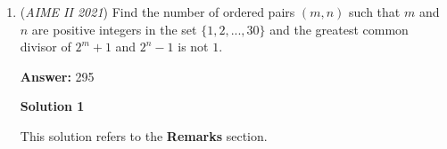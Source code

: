 \begin{enumerate}
            \begin{itemize}
        \item \href{https://artofproblemsolving.com/wiki/index.php/2003\_AIME\_II\_Problems/Problem\_13}{2003 AIME II Problem 13}
            \end{itemize}
            
            \begin{itemize}
        \item \href{https://artofproblemsolving.com/wiki/index.php/2021\_AMC\_12A\_Problems/Problem\_23}{2021 AMC 12A Problem 23}
            \end{itemize}
            
            \begin{itemize}
        \item \href{https://artofproblemsolving.com/wiki/index.php/2022\_AMC\_8\_Problems/Problem\_25}{2022 AMC 8 Problem 25}
            \end{itemize}
            They can all be solved by \href{https://en.wikipedia.org/wiki/Markov\_chain}{Markov Chain} and \href{https://en.wikipedia.org/wiki/Dynamic\_programming}{Dynamic Programming}.

 Let $p_{ij} = P(X_{n+1} = j | X_n = i)$ be the probability that state $i$ transits to state $j$ on the next step, and $s_i$ be the probability of being in state $i$. It follows that $s_j$ is the sum of the products of $s_i$ and $p_{ij}$ of all the previous state $i$: 
 \[s_j = \sum_{i} (s_{i} \cdot p_{ij}).\]This formula can also be applied to solve \href{https://artofproblemsolving.com/wiki/index.php/2019\_AMC\_10B\_Problems/Problem\_22}{2019 AMC10B Problem 22}.

 


	\item (\textit{AIME II 2021}) Find the number of ordered pairs $(m, n)$ such that $m$ and $n$ are positive integers in the set $\{1, 2, ..., 30\}$ and the greatest common divisor of $2^m + 1$ and $2^n - 1$ is not $1$.


 
 \textbf{Answer: }295



\textbf{Solution 1}

This solution refers to the \textbf{Remarks} section.


\end{enumerate}
